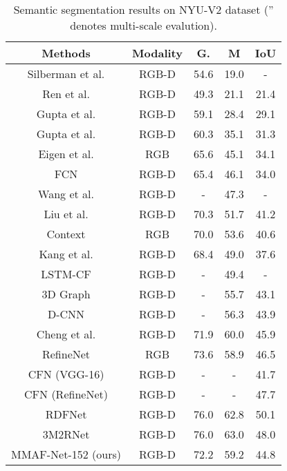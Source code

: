 \documentclass[journal,transmag]{IEEEtran}
\begin{document}
\begin{table}
	\caption{Semantic segmentation results on NYU-V2 dataset ('' denotes multi-scale evalution).}
	\label{tab:4}
	\begin{tabular}{|c|c|c|c|c|}
		\hline
		Methods	&	Modality &	G.&	M&	IoU	\\
		\hline
		Silberman et al. \cite{silberman2012indoor}&	RGB-D&	54.6&	19.0&	- 	\\
		\hline
		Ren et al. \cite{ren2012rgb}&	RGB-D&	49.3&	21.1&	21.4 \\
		\hline
		Gupta et al. \cite{gupta2013perceptual}& RGB-D&	59.1&	28.4&	29.1\\
		\hline
		Gupta et al. \cite{gupta2014learning}&	RGB-D&	60.3&	35.1&	31.3\\
		\hline
		Eigen et al. \cite{eigen2015predicting}&	RGB&	65.6&	45.1&	34.1\\
		\hline
		FCN \cite{long2015fully}&	RGB-D&	65.4&	46.1&	34.0\\
		\hline
		Wang et al. \cite{wang2016learning}	&RGB-D&	-&	47.3&	-\\
		\hline
		Liu et al. \cite{liu2018rgb} &	RGB-D&70.3& 51.7& 41.2\\
		\hline
		Context \cite{lin2018exploring}&	RGB&	70.0&	53.6&	40.6\\
		\hline
    	Kang et al. \cite{kang2018depth}& RGB-D&68.4&49.0&37.6\\
    	\hline
		LSTM-CF \cite{li2016lstm}&	RGB-D	& -	& 49.4 &	- \\
		\hline
		3D Graph \cite{qi20173d} &RGB-D & - &55.7 & 43.1  \\
		\hline
		D-CNN \cite{wang2018depth} & RGB-D&	-&	56.3&	43.9\\
		\hline
		Cheng et al. \cite{cheng2017localitysensitive} & RGB-D& 71.9 & 60.0 & 45.9\\
		\hline
		RefineNet \cite{lin2017refinenet}&		RGB&	73.6&	58.9&	46.5\\
		\hline
CFN (VGG-16) \cite{lin2017cascaded}& RGB-D& -&-&41.7\\
		\hline
		CFN (RefineNet)\cite{lin2017cascaded}& RGB-D& -&-&47.7\\
		\hline
		RDFNet \cite{park2017rdfnet}&	RGB-D&	76.0&	62.8&	50.1\\
		\hline
		3M2RNet \cite{fooladgar20193m2rnet} & 	RGB-D&	76.0&	63.0 &	48.0\\
		\hline
		MMAF-Net-152 (ours) & 	RGB-D&72.2	&59.2	&44.8\\
		\hline		
	\end{tabular}
\end{table}
\end{document}
